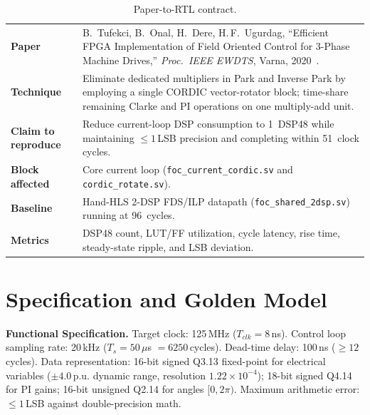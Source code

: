 \documentclass[11pt,a4paper]{article}
\begin{document}
\begin{table}[H]\centering\small
\caption{Paper-to-RTL contract.}\label{tab:contract}
\begin{tabularx}{\linewidth}{@{}lX@{}}
\toprule
\textbf{Paper} & B.~Tufekci, B.~Onal, H.~Dere, H.\,F.~Ugurdag, ``Efficient FPGA Implementation of Field Oriented Control for 3-Phase Machine Drives,'' \emph{Proc.\ IEEE EWDTS}, Varna, 2020~\cite{tufekci2020}.\\
\textbf{Technique} & Eliminate dedicated multipliers in Park and Inverse Park by employing a single CORDIC vector-rotator block; time-share remaining Clarke and PI operations on one multiply-add unit.\\
\textbf{Claim to reproduce} & Reduce current-loop DSP consumption to 1~DSP48 while maintaining $\le 1$\,LSB precision and completing within 51~clock cycles.\\
\textbf{Block affected} & Core current loop (\texttt{foc\_current\_cordic.sv} and \texttt{cordic\_rotate.sv}).\\
\textbf{Baseline} & Hand-HLS 2-DSP FDS/ILP datapath (\texttt{foc\_shared\_2dsp.sv}) running at 96~cycles.\\
\textbf{Metrics} & DSP48 count, LUT/FF utilization, cycle latency, rise time, steady-state ripple, and LSB deviation.\\
\bottomrule
\end{tabularx}
\end{table}

\section{Specification and Golden Model}
\label{sec:spec}

\textbf{Functional Specification.} Target clock: 125\,MHz ($T_{clk} = 8$\,ns). Control loop sampling rate: 20\,kHz ($T_s = 50\,\mu$s $= 6250$\,cycles). Dead-time delay: 100\,ns ($\ge 12$\,cycles). Data representation: 16-bit signed Q3.13 fixed-point for electrical variables ($\pm 4.0$\,p.u. dynamic range, resolution $1.22 \times 10^{-4}$); 18-bit signed Q4.14 for PI gains; 16-bit unsigned Q2.14 for angles $[0, 2\pi)$. Maximum arithmetic error: $\le 1$\,LSB against double-precision math.
\end{document}
